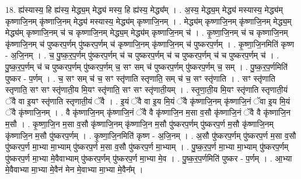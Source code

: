 \documentclass[17pt]{extarticle}
\begin{document}
18. ह्य॑स्यास्य॒ हि ह्य॑स्य॒ मेद्ध्य॒म् मेद्ध्य॑ मस्य॒ हि ह्य॑स्य॒ मेद्ध्य᳚म् । . अ॒स्य॒ मेद्ध्य॒म् मेद्ध्य॑ मस्यास्य॒ मेद्ध्य॑म् कृष्णाजि॒नम् कृ॑ष्णाजि॒नम् मेद्ध्य॑ मस्यास्य॒ मेद्ध्य॑म् कृष्णाजि॒नम् । . मेद्ध्य॑म् कृष्णाजि॒नम् कृ॑ष्णाजि॒नम् मेद्ध्य॒म् मेद्ध्य॑म् कृष्णाजि॒नम् च॑ च कृष्णाजि॒नम् मेद्ध्य॒म् मेद्ध्य॑म् कृष्णाजि॒नम् च॑ । . कृ॒ष्णा॒जि॒नम् च॑ च कृष्णाजि॒नम् कृ॑ष्णाजि॒नम् च॑ पुष्करप॒र्णम् पु॑ष्करप॒र्णम् च॑ कृष्णाजि॒नम् कृ॑ष्णाजि॒नम् च॑ पुष्करप॒र्णम् । . कृ॒ष्णा॒जि॒नमिति॑ कृष्ण - अ॒जि॒नम् । . च॒ पु॒ष्क॒र॒प॒र्णम् पु॑ष्करप॒र्णम् च॑ च पुष्करप॒र्णम् च॑ च पुष्करप॒र्णम् च॑ च पुष्करप॒र्णम् च॑ । . पु॒ष्क॒र॒प॒र्णम् च॑ च पुष्करप॒र्णम् पु॑ष्करप॒र्णम् च॒ सꣳ सम् च॑ पुष्करप॒र्णम् पु॑ष्करप॒र्णम् च॒ सम् । . पु॒ष्क॒र॒प॒र्णमिति॑ पुष्कर - प॒र्णम् । . च॒ सꣳ सम् च॑ च॒ सꣳ स्तृ॑णाति स्तृणाति॒ सम् च॑ च॒ सꣳ स्तृ॑णाति । . सꣳ स्तृ॑णाति स्तृणाति॒ सꣳ सꣳ स्तृ॑णाती॒य मि॒यꣳ स्तृ॑णाति॒ सꣳ सꣳ स्तृ॑णाती॒यम् । . स्तृ॒णा॒ती॒य मि॒यꣳ स्तृ॑णाति स्तृणाती॒यं ॅवै वा इ॒यꣳ स्तृ॑णाति स्तृणाती॒यं ॅवै । . इ॒यं ॅवै वा इ॒य मि॒यं ॅवै कृ॑ष्णाजि॒नम् कृ॑ष्णाजि॒नं ॅवा इ॒य मि॒यं ॅवै कृ॑ष्णाजि॒नम् । . वै कृ॑ष्णाजि॒नम् कृ॑ष्णाजि॒नं ॅवै वै कृ॑ष्णाजि॒न म॒सा व॒सौ कृ॑ष्णाजि॒नं ॅवै वै कृ॑ष्णाजि॒न म॒सौ । . कृ॒ष्णा॒जि॒न म॒सा व॒सौ कृ॑ष्णाजि॒नम् कृ॑ष्णाजि॒न म॒सौ पु॑ष्करप॒र्णम् पु॑ष्करप॒र्ण म॒सौ कृ॑ष्णाजि॒नम् कृ॑ष्णाजि॒न म॒सौ पु॑ष्करप॒र्णम् । . कृ॒ष्णा॒जि॒नमिति॑ कृष्ण - अ॒जि॒नम् । . अ॒सौ पु॑ष्करप॒र्णम् पु॑ष्करप॒र्ण म॒सा व॒सौ पु॑ष्करप॒र्ण मा॒भ्या मा॒भ्याम् पु॑ष्करप॒र्ण म॒सा व॒सौ पु॑ष्करप॒र्ण मा॒भ्याम् । . पु॒ष्क॒र॒प॒र्ण मा॒भ्या मा॒भ्याम् पु॑ष्करप॒र्णम् पु॑ष्करप॒र्ण मा॒भ्या मे॒वैवाभ्याम् पु॑ष्करप॒र्णम् पु॑ष्करप॒र्ण मा॒भ्या मे॒व । . पु॒ष्क॒र॒प॒र्णमिति॑ पुष्कर - प॒र्णम् । . आ॒भ्या मे॒वैवाभ्या मा॒भ्या मे॒वैन॑ मेन मे॒वाभ्या मा॒भ्या मे॒वैन᳚म् । \newline
\end{document}
